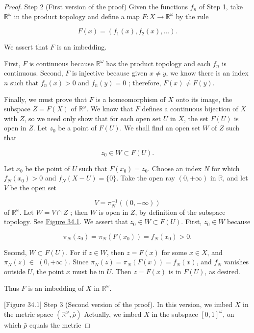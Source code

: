 \begin{proof}
Step 2 (First version of the proof) Given the functions \(f_{n}\) of Step 1, take \(\mathbb{R}^{\omega }\) in the product topology and define a map \(F : X \rightarrow {\mathbb{R}}^{\omega }\) by the rule

\[
F(x) = ( {f_{1}(x),f_{2}(x),\ldots }).
\]

We assert that \(F\) is an imbedding.

First, \(F\) is continuous because \(\mathbb{R}^{\omega }\) has the product topology and each \(f_{n}\) is continuous. Second, \(F\) is injective because given \(x \neq y\), we know there is an index \(n\) such that \(f_{n}(x) > 0\) and \(f_{n}( y) = 0\) ; therefore, \(F(x) \neq F( y)\).

Finally, we must prove that \(F\) is a homeomorphism of \(X\) onto its image, the subspace \(Z = F( X)\) of \(\mathbb{R}^{\omega }\). We know that \(F\) defines a continuous bijection of \(X\) with \(Z\), so we need only show that for each open set \(U\) in \(X\), the set \(F( U)\) is open in \(Z\). Let \(z_{0}\) be a point of \(F( U)\). We shall find an open set \(W\) of \(Z\) such that

\[
z_{0} \in W \subset F( U) \text{.}
\]

Let \(x_{0}\) be the point of \(U\) such that \(F( x_{0}) = z_{0}\). Choose an index \(N\) for which \(f_{N}( x_{0}) > 0\) and \(f_{N}( {X - U}) = \{ 0\}\). Take the open ray \(( {0, + \infty })\) in \(\mathbb{R}\), and let \(V\) be the open set

\[
V = {\pi }_N^{-1}( ( {0, + \infty }) )
\]
of \(\mathbb{R}^{\omega }\). Let \(W = V \cap Z\) ; then \(W\) is open in \(Z\), by definition of the subspace topology. See \hyperref[fig:34.1]{Figure 34.1}. We assert that \(z_{0} \in W \subset F( U)\). First, \(z_{0} \in W\) because

\[
{\pi }_{N}( z_{0}) = {\pi }_{N}( {F( x_{0}) }) = f_{N}( x_{0}) > 0.
\]

Second, \(W \subset F( U)\). For if \(z \in W\), then \(z = F(x)\) for some \(x \in X\), and \({\pi }_{N}( z) \in\) \(( {0, + \infty })\). Since \({\pi }_{N}( z) = {\pi }_{N}( {F(x) }) = f_{N}(x)\), and \(f_{N}\) vanishes outside \(U\), the point \(x\) must be in \(U\). Then \(z = F(x)\) is in \(F( U)\), as desired.

Thus \(F\) is an imbedding of \(X\) in \(\mathbb{R}^{\omega }\).

[Figure 34.1]
Step 3 (Second version of the proof). In this version, we imbed \(X\) in the metric space \(( {\mathbb{R}^{\omega },\bar{\rho }})\) Actually, we imbed \(X\) in the subspace \({[ 0,1] }^{\omega }\), on which \(\bar{\rho }\) equals the metric


\end{proof}
